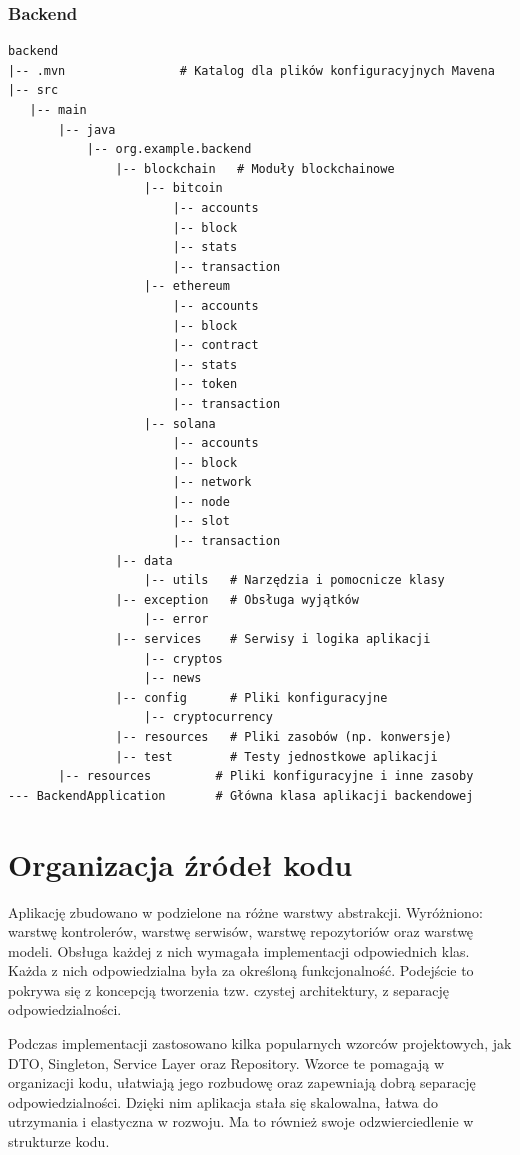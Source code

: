 \subsubsection{Backend}
\begin{lstlisting}[basicstyle=\footnotesize\ttfamily]
backend
|-- .mvn                # Katalog dla plików konfiguracyjnych Mavena
|-- src
   |-- main
       |-- java
           |-- org.example.backend
               |-- blockchain   # Moduły blockchainowe
                   |-- bitcoin
                       |-- accounts
                       |-- block
                       |-- stats
                       |-- transaction
                   |-- ethereum
                       |-- accounts
                       |-- block
                       |-- contract
                       |-- stats
                       |-- token
                       |-- transaction
                   |-- solana
                       |-- accounts
                       |-- block
                       |-- network
                       |-- node
                       |-- slot
                       |-- transaction
               |-- data
                   |-- utils   # Narzędzia i pomocnicze klasy
               |-- exception   # Obsługa wyjątków
                   |-- error
               |-- services    # Serwisy i logika aplikacji
                   |-- cryptos
                   |-- news
               |-- config      # Pliki konfiguracyjne
                   |-- cryptocurrency
               |-- resources   # Pliki zasobów (np. konwersje)
               |-- test        # Testy jednostkowe aplikacji
       |-- resources         # Pliki konfiguracyjne i inne zasoby
--- BackendApplication       # Główna klasa aplikacji backendowej
\end{lstlisting}



\section{Organizacja źródeł kodu}
Aplikację zbudowano w podzielone na różne warstwy abstrakcji. Wyróżniono: warstwę kontrolerów, warstwę serwisów, warstwę repozytoriów oraz warstwę modeli. Obsługa każdej z nich wymagała implementacji odpowiednich klas. Każda z nich odpowiedzialna była za określoną funkcjonalność. Podejście to pokrywa się z koncepcją tworzenia tzw. czystej architektury, z separację odpowiedzialności. 

Podczas implementacji zastosowano kilka popularnych wzorców projektowych, jak DTO, Singleton, Service Layer oraz Repository. Wzorce te pomagają w organizacji kodu, ułatwiają jego rozbudowę oraz zapewniają dobrą separację odpowiedzialności. Dzięki nim aplikacja stała się skalowalna, łatwa do utrzymania i elastyczna w rozwoju. 
Ma to również swoje odzwierciedlenie w strukturze kodu.

